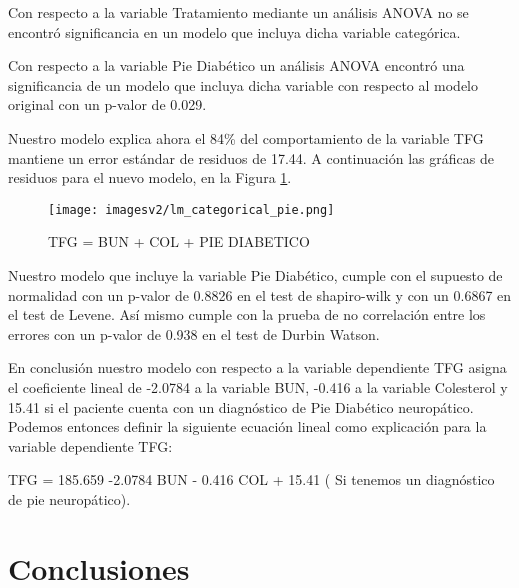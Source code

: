 \documentclass[runningheads,a4paper]{llncs}
\begin{document}
Con respecto a la variable Tratamiento mediante un análisis ANOVA no se encontró significancia en un modelo que incluya dicha variable categórica.

Con respecto a la variable Pie Diabético un análisis ANOVA encontró una significancia de un modelo que incluya dicha variable con respecto al modelo original con un p-valor de 0.029. 

Nuestro modelo explica ahora el 84\% del comportamiento de la variable TFG mantiene un error estándar de residuos de 17.44. A continuación las gráficas de residuos para el nuevo modelo, en la Figura \ref{fig:final_residuos}.


\begin{figure}[!ht]
\centering
\texttt{[image: imagesv2/lm\_categorical\_pie.png]}
\caption{TFG = BUN + COL + PIE DIABETICO}
\label{fig:final_residuos}
\end{figure}

Nuestro modelo que incluye la variable Pie Diabético, cumple con el supuesto de normalidad con un p-valor de 0.8826 en el test de shapiro-wilk y con un 0.6867 en el test de Levene. Así mismo cumple con la prueba de no correlación entre los errores con un p-valor de 0.938 en el test de Durbin Watson.  

En conclusión nuestro modelo con respecto a la variable dependiente TFG asigna el coeficiente lineal de -2.0784 a la variable BUN, -0.416 a la variable Colesterol y 15.41 si el paciente cuenta con un diagnóstico de Pie Diabético neuropático. Podemos entonces definir la siguiente ecuación lineal como explicación para la variable dependiente TFG:

TFG = 185.659  -2.0784 BUN - 0.416 COL + 15.41 ( Si tenemos un diagnóstico de pie neuropático).

\section{Conclusiones}
\end{document}
